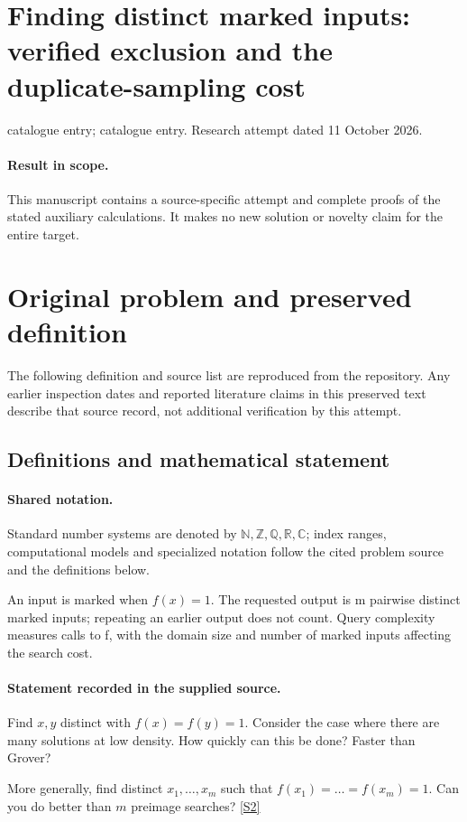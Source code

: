 \documentclass[11pt]{article}
\begin{document}
\section*{Finding distinct marked inputs: verified exclusion and the duplicate-sampling cost}
\noindent catalogue entry; catalogue entry. Research attempt dated 11 October 2026.
\paragraph{Result in scope.}This manuscript contains a source-specific attempt and complete proofs of the stated auxiliary calculations. It makes no new solution or novelty claim for the entire target.
\section{Original problem and preserved definition}
The following definition and source list are reproduced from the repository. Any earlier inspection dates and reported literature claims in this preserved text describe that source record, not additional verification by this attempt.
\subsection{Definitions and mathematical statement}

\paragraph{Shared notation.}Standard number systems are denoted by $\mathbb N,\mathbb Z,\mathbb Q,\mathbb R,\mathbb C$; index ranges, computational models and specialized notation follow the cited problem source and the definitions below.


An input is marked when $f(x)=1$. The requested output is m pairwise distinct marked inputs; repeating an earlier output does not count. Query complexity measures calls to f, with the domain size and number of marked inputs affecting the search cost.
\paragraph{Statement recorded in the supplied source.}
Find $x,y$ distinct with $f(x) = f(y) = 1$. Consider the case where there are many solutions at low density. How quickly can this be done? Faster than Grover?

More generally, find distinct $x_1,\dots, x_m$ such that $f(x_1) = \dots = f(x_m) = 1$. Can you do better than $m$ preimage searches? \href{http://aimpl.org/quantumalg/2/}{[S2]}
\end{document}
